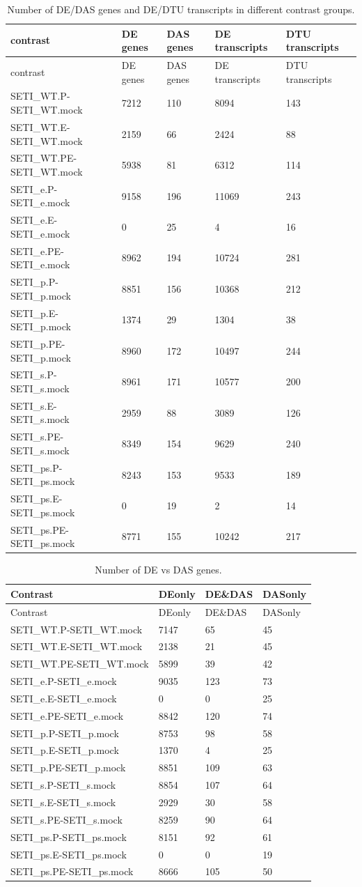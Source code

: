 \documentclass[]{article}
\begin{document}
\begin{longtable}[]{@{}lllll@{}}
\caption{Number of DE/DAS genes and DE/DTU transcripts in different
contrast groups.}\tabularnewline
\toprule
contrast & DE genes & DAS genes & DE transcripts & DTU
transcripts\tabularnewline
\midrule
\endfirsthead
\toprule
contrast & DE genes & DAS genes & DE transcripts & DTU
transcripts\tabularnewline
\midrule
\endhead
SETI\_WT.P-SETI\_WT.mock & 7212 & 110 & 8094 & 143\tabularnewline
SETI\_WT.E-SETI\_WT.mock & 2159 & 66 & 2424 & 88\tabularnewline
SETI\_WT.PE-SETI\_WT.mock & 5938 & 81 & 6312 & 114\tabularnewline
SETI\_e.P-SETI\_e.mock & 9158 & 196 & 11069 & 243\tabularnewline
SETI\_e.E-SETI\_e.mock & 0 & 25 & 4 & 16\tabularnewline
SETI\_e.PE-SETI\_e.mock & 8962 & 194 & 10724 & 281\tabularnewline
SETI\_p.P-SETI\_p.mock & 8851 & 156 & 10368 & 212\tabularnewline
SETI\_p.E-SETI\_p.mock & 1374 & 29 & 1304 & 38\tabularnewline
SETI\_p.PE-SETI\_p.mock & 8960 & 172 & 10497 & 244\tabularnewline
SETI\_s.P-SETI\_s.mock & 8961 & 171 & 10577 & 200\tabularnewline
SETI\_s.E-SETI\_s.mock & 2959 & 88 & 3089 & 126\tabularnewline
SETI\_s.PE-SETI\_s.mock & 8349 & 154 & 9629 & 240\tabularnewline
SETI\_ps.P-SETI\_ps.mock & 8243 & 153 & 9533 & 189\tabularnewline
SETI\_ps.E-SETI\_ps.mock & 0 & 19 & 2 & 14\tabularnewline
SETI\_ps.PE-SETI\_ps.mock & 8771 & 155 & 10242 & 217\tabularnewline
\bottomrule
\end{longtable}

\begin{longtable}[]{@{}llll@{}}
\caption{Number of DE vs DAS genes.}\tabularnewline
\toprule
Contrast & DEonly & DE\&DAS & DASonly\tabularnewline
\midrule
\endfirsthead
\toprule
Contrast & DEonly & DE\&DAS & DASonly\tabularnewline
\midrule
\endhead
SETI\_WT.P-SETI\_WT.mock & 7147 & 65 & 45\tabularnewline
SETI\_WT.E-SETI\_WT.mock & 2138 & 21 & 45\tabularnewline
SETI\_WT.PE-SETI\_WT.mock & 5899 & 39 & 42\tabularnewline
SETI\_e.P-SETI\_e.mock & 9035 & 123 & 73\tabularnewline
SETI\_e.E-SETI\_e.mock & 0 & 0 & 25\tabularnewline
SETI\_e.PE-SETI\_e.mock & 8842 & 120 & 74\tabularnewline
SETI\_p.P-SETI\_p.mock & 8753 & 98 & 58\tabularnewline
SETI\_p.E-SETI\_p.mock & 1370 & 4 & 25\tabularnewline
SETI\_p.PE-SETI\_p.mock & 8851 & 109 & 63\tabularnewline
SETI\_s.P-SETI\_s.mock & 8854 & 107 & 64\tabularnewline
SETI\_s.E-SETI\_s.mock & 2929 & 30 & 58\tabularnewline
SETI\_s.PE-SETI\_s.mock & 8259 & 90 & 64\tabularnewline
SETI\_ps.P-SETI\_ps.mock & 8151 & 92 & 61\tabularnewline
SETI\_ps.E-SETI\_ps.mock & 0 & 0 & 19\tabularnewline
SETI\_ps.PE-SETI\_ps.mock & 8666 & 105 & 50\tabularnewline
\bottomrule
\end{longtable}
\end{document}
